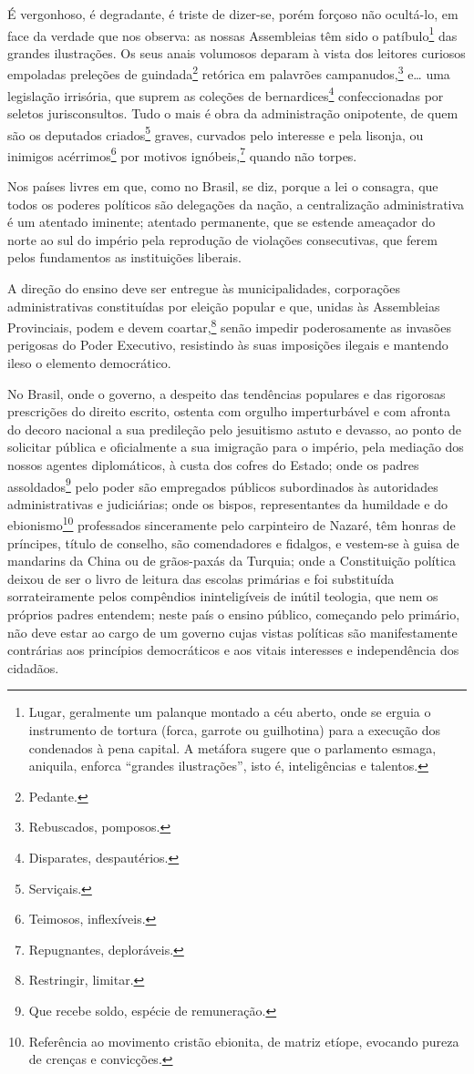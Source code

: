 É vergonhoso, é degradante, é triste de dizer-se, porém forçoso não
ocultá-lo, em face da verdade que nos observa: as nossas Assembleias têm
sido o patíbulo\footnote{Lugar, geralmente um palanque montado a céu
  aberto, onde se erguia o instrumento de tortura (forca, garrote ou
  guilhotina) para a execução dos condenados à pena capital. A metáfora
  sugere que o parlamento esmaga, aniquila, enforca ``grandes
  ilustrações'', isto é, inteligências e talentos.} das grandes
ilustrações. Os seus anais volumosos deparam à vista dos leitores
curiosos empoladas preleções de guindada\footnote{Pedante.} retórica
em palavrões campanudos,\footnote{Rebuscados, pomposos.} e\ldots{} uma
legislação irrisória, que suprem as coleções de bernardices\footnote{
  Disparates, despautérios.} confeccionadas por seletos jurisconsultos.
Tudo o mais é obra da administração onipotente, de quem são os deputados
criados\footnote{Serviçais.} graves, curvados pelo interesse e pela
lisonja, ou inimigos acérrimos\footnote{Teimosos, inflexíveis.} por
motivos ignóbeis,\footnote{Repugnantes, deploráveis.} quando não
torpes.

Nos países livres em que, como no Brasil, se diz, porque a lei o
consagra, que todos os poderes políticos são delegações da nação, a
centralização administrativa é um atentado iminente; atentado
permanente, que se estende ameaçador do norte ao sul do império pela
reprodução de violações consecutivas, que ferem pelos fundamentos as
instituições liberais.

A direção do ensino deve ser entregue às municipalidades, corporações
administrativas constituídas por eleição popular e que, unidas às
Assembleias Provinciais, podem e devem coartar,\footnote{Restringir, limitar.} senão impedir poderosamente as invasões perigosas do Poder Executivo, resistindo às
suas imposições ilegais e mantendo ileso o elemento democrático.

No Brasil, onde o governo, a despeito das tendências populares e das
rigorosas prescrições do direito escrito, ostenta com orgulho
imperturbável e com afronta do decoro nacional a sua predileção pelo
jesuitismo astuto e devasso, ao ponto de solicitar pública e
oficialmente a sua imigração para o império, pela mediação dos nossos
agentes diplomáticos, à custa dos cofres do Estado; onde os padres
assoldados\footnote{Que recebe soldo, espécie de remuneração.} pelo
poder são empregados públicos subordinados às autoridades
administrativas e judiciárias; onde os bispos, representantes da
humildade e do ebionismo\footnote{Referência ao movimento cristão
  ebionita, de matriz etíope, evocando pureza de crenças e convicções.}
professados sinceramente pelo carpinteiro de Nazaré, têm honras de
príncipes, título de conselho, são comendadores e fidalgos, e vestem-se
à guisa de mandarins da China ou de grãos-paxás da Turquia; onde a
Constituição política deixou de ser o livro de leitura das escolas
primárias e foi substituída sorrateiramente pelos compêndios
ininteligíveis de inútil teologia, que nem os próprios padres entendem;
neste país o ensino público, começando pelo primário, não deve estar ao
cargo de um governo cujas vistas políticas são manifestamente contrárias
aos princípios democráticos e aos vitais interesses e independência dos
cidadãos.

